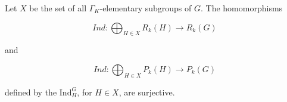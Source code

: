 Let $X$ be the set of all $\Gamma_K$-elementary subgroups of $G$. The homomorphisms

$$Ind: \bigoplus_{H \in X} R_k(H) \rightarrow R_k(G)$$

and

$$Ind: \bigoplus_{H \in X} P_k(H) \rightarrow P_k(G)$$

defined by the $\text{Ind}_H^G$, for $H \in X$, are surjective.

